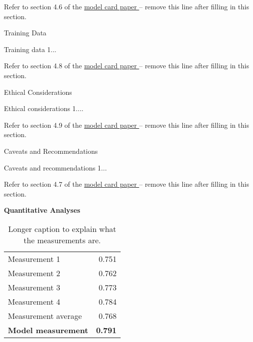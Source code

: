 \documentclass{article}
\begin{document}
\begin{adjustwidth}{-60pt}{-30pt}
\begin{singlespace}
\begin{tcolorbox}[title=\textbf{Model Card - CheXNet},
    breakable, sharp corners, boxrule=0.7pt]
{Refer to section 4.6 of the \href{https://arxiv.org/abs/1810.03993}{model card paper } -- remove this line after filling in this section.

\begin{mcsection}{Training Data}
    \item Training data 1...
\end{mcsection}

\pagebreak

Refer to section 4.8 of the \href{https://arxiv.org/abs/1810.03993}{model card paper } -- remove this line after filling in this section.

\begin{mcsection}{Ethical Considerations}
    \item Ethical considerations 1....
\end{mcsection}

Refer to section 4.9 of the \href{https://arxiv.org/abs/1810.03993}{model card paper } -- remove this line after filling in this section.

\begin{mcsection}{Caveats and Recommendations}
    \item Caveats and recommendations 1...
\end{mcsection}

Refer to section 4.7 of the \href{https://arxiv.org/abs/1810.03993}{model card paper } -- remove this line after filling in this section.

\textbf{Quantitative Analyses}

\begin{table}[H]
\centering
\small{
\begin{tabular}{lr}
Measurement 1       & 0.751  \\
Measurement 2       & 0.762 \\
Measurement 3       & 0.773 \\
Measurement 4       & 0.784 \\
Measurement average & 0.768  \\ \hline
\textbf{Model measurement}  & \textbf{0.791} \\ \hline
\end{tabular} } \\
\caption[Short caption used in list of tables.]{\small{Longer caption to explain what the measurements are.}}
\end{table}

} %
\end{tcolorbox}
\end{singlespace}
\end{adjustwidth}
\end{document}
